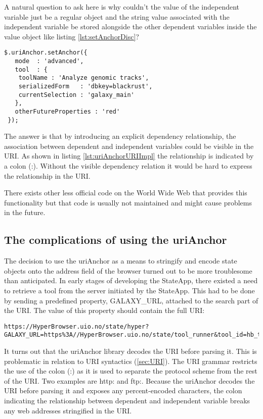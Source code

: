 \documentclass[english]{ifimaster}
\begin{document}
A natural question to ask here is why couldn't the value of the independent variable just be a regular object and the string value associated with the independent variable be stored alongside the other dependent variables inside the value object like listing \ref{lst:setAnchorDisc}?

\begin{lstlisting}[caption={Example of a stringified complex object.},label={lst:setAnchorDisc}]
 $.uriAnchor.setAnchor({
   mode  : 'advanced',
   tool  : {
    toolName : 'Analyze genomic tracks',
    serializedForm   : 'dbkey=blackrust',
    currentSelection : 'galaxy_main'
   },
   otherFutureProperties : 'red'
 });
 \end{lstlisting}

The answer is that by introducing an explicit dependency relationship, the association between dependent and independent variables could be visible in the URI. As shown in listing \ref{lst:uriAnchorURIImpl} the relationship is indicated by a colon (:). Without the visible dependency relation it would be hard to express the relationship in the URI. 

There exists other less official code on the World Wide Web that provides this functionality but that code is usually not maintained and might cause problems in the future. 

\subsection{The complications of using the uriAnchor} 
The decision to use the uriAnchor as a means to stringify and encode state objects onto the address field of the browser turned out to be more troublesome than anticipated. In early stages of developing the StateApp, there existed a need to retrieve a tool from the server initiated by the StateApp. This had to be done by sending a predefined property, GALAXY\_URL, attached to the search part of the URI. The value of this property should contain the full URI:

\begin{lstlisting}[caption= {The full URI to retrieve a HyperBrowser tool.}, label={lst:uriAnchorURIDisc}]
https://HyperBrowser.uio.no/state/hyper?GALAXY_URL=https%3A//HyperBrowser.uio.no/state/tool_runner&tool_id=hb_test_1
\end{lstlisting}

It turns out that the uriAnchor library decodes the URI before parsing it. This is problematic in relation to URI syntactics (\ref{sec:URI}). The URI grammar restricts the use of the colon (:) as it is used to separate the protocol scheme from the rest of the URI. Two examples are http: and ftp:. Because the uriAnchor decodes the URI before parsing it and exposes any percent-encoded characters, the colon indicating the relationship between dependent and independent variable breaks any web addresses stringified in the URI. 
\end{document}
